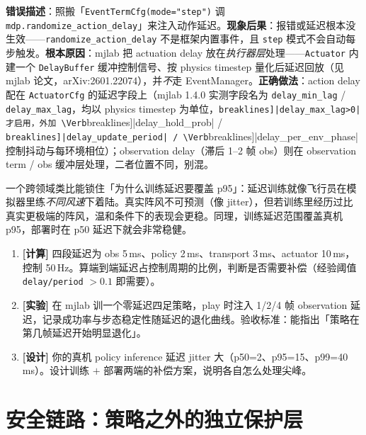 \begin{pitfall}
\textbf{错误描述}：照搬「\texttt{EventTermCfg(mode="step")} 调 \texttt{mdp.\allowbreak randomize\_action\_delay}」来注入动作延迟。\textbf{现象后果}：报错或延迟根本没生效——\texttt{randomize\_action\_delay} 不是框架内置事件，且 \texttt{step} 模式不会自动每步触发。\textbf{根本原因}：mjlab 把 actuation delay 放在\emph{执行器层}处理——\texttt{Actuator} 内建一个 \texttt{DelayBuffer} 缓冲控制信号、按 physics timestep 量化后延迟回放（见 mjlab 论文，arXiv:2601.22074），并\emph{不}走 EventManager。\textbf{正确做法}：action delay 配在 \verb|ActuatorCfg| 的延迟字段上（mjlab 1.4.0 实测字段名为 \verb|delay_min_lag| / \verb|delay_max_lag|，均以 physics timestep 为单位，\Verb[breaklines]|delay_max_lag>0| 才启用，外加 \Verb[breaklines]|delay_hold_prob| / \Verb[breaklines]|delay_update_period| / \Verb[breaklines]|delay_per_env_phase| 控制抖动与每环境相位）；observation delay（滞后 1--2 帧 obs）则在 observation term / obs 缓冲层处理，二者位置不同，别混。
\end{pitfall}

一个跨领域类比能锁住「为什么训练延迟要覆盖 p95」：延迟训练就像飞行员在模拟器里练\emph{不同风速}下着陆。真实阵风不可预测（像 jitter），但若训练里经历过比真实更极端的阵风，温和条件下的表现会更稳。同理，训练延迟范围覆盖真机 p95，部署时在 p50 延迟下就会非常稳健。

\begin{practice}[延迟动手]
\begin{enumerate}
  \item \textbf{[计算]} 四段延迟为 obs 5\,ms、policy 2\,ms、transport 3\,ms、actuator 10\,ms，控制 50\,Hz。算端到端延迟占控制周期的比例，判断是否需要补偿（经验阈值 \texttt{delay/\allowbreak period} $>0.1$ 即需要）。
  \item \textbf{[实验]} 在 mjlab 训一个零延迟四足策略，play 时注入 1/2/4 帧 observation 延迟，记录成功率与步态稳定性随延迟的退化曲线。验收标准：能指出「策略在第几帧延迟开始明显退化」。
  \item \textbf{[设计]} 你的真机 policy inference 延迟 jitter 大（p50=2、p95=15、p99=40\,ms）。设计训练 $+$ 部署两端的补偿方案，说明各自怎么处理尖峰。
\end{enumerate}
\end{practice}

\section{安全链路：策略之外的独立保护层}
\label{sec:rlmc-s2r-safety}

